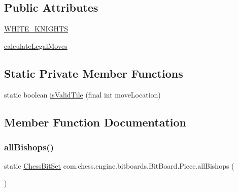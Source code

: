 \subsection*{Public Attributes}
\begin{DoxyCompactItemize}
\item 
\mbox{\hyperlink{enumcom_1_1chess_1_1engine_1_1bitboards_1_1_bit_board_1_1_piece_af62d1b47da21b7319a12ab3853b6592e}{W\+H\+I\+T\+E\+\_\+\+K\+N\+I\+G\+H\+TS}}
\item 
\mbox{\hyperlink{enumcom_1_1chess_1_1engine_1_1bitboards_1_1_bit_board_1_1_piece_a13aed03f38125d8222b25923eedf17bd}{calculate\+Legal\+Moves}}
\end{DoxyCompactItemize}
\subsection*{Static Private Member Functions}
\begin{DoxyCompactItemize}
\item 
static boolean \mbox{\hyperlink{enumcom_1_1chess_1_1engine_1_1bitboards_1_1_bit_board_1_1_piece_ad0404f1d2d21141a004cd0300e907619}{is\+Valid\+Tile}} (final int move\+Location)
\end{DoxyCompactItemize}


\subsection{Member Function Documentation}
\mbox{\label{enumcom_1_1chess_1_1engine_1_1bitboards_1_1_bit_board_1_1_piece_aaa9cbd20844bb6903b75779f9c4b25a5}} 
\subsubsection{\texorpdfstring{allBishops()}{allBishops()}}
{\footnotesize\ttfamily static \mbox{\hyperlink{classcom_1_1chess_1_1engine_1_1bitboards_1_1_chess_bit_set}{Chess\+Bit\+Set}} com.\+chess.\+engine.\+bitboards.\+Bit\+Board.\+Piece.\+all\+Bishops (\begin{DoxyParamCaption}{ }\end{DoxyParamCaption})\hspace{0.3cm}{\ttfamily [static]}}

